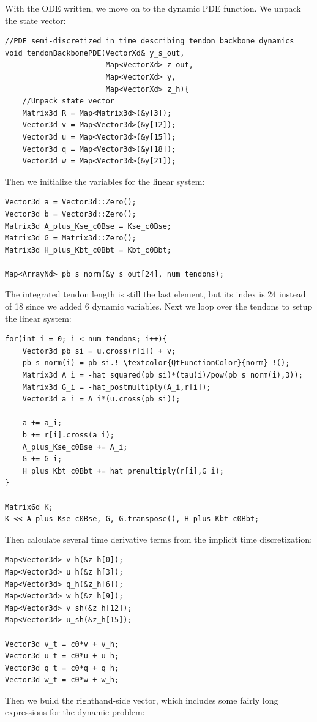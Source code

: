 \documentclass[12pt]{article}
\begin{document}
With the ODE written, we move on to the dynamic PDE function. We unpack the state vector:
\begin{lstlisting}
//PDE semi-discretized in time describing tendon backbone dynamics
void tendonBackbonePDE(VectorXd& y_s_out,
                       Map<VectorXd> z_out,
                       Map<VectorXd> y,
                       Map<VectorXd> z_h){
    //Unpack state vector
    Matrix3d R = Map<Matrix3d>(&y[3]);
    Vector3d v = Map<Vector3d>(&y[12]);
    Vector3d u = Map<Vector3d>(&y[15]);
    Vector3d q = Map<Vector3d>(&y[18]);
    Vector3d w = Map<Vector3d>(&y[21]);
\end{lstlisting}
Then we initialize the variables for the linear system:
\begin{lstlisting}
Vector3d a = Vector3d::Zero();
Vector3d b = Vector3d::Zero();
Matrix3d A_plus_Kse_c0Bse = Kse_c0Bse;
Matrix3d G = Matrix3d::Zero();
Matrix3d H_plus_Kbt_c0Bbt = Kbt_c0Bbt;

Map<ArrayNd> pb_s_norm(&y_s_out[24], num_tendons);
\end{lstlisting}
The integrated tendon length is still the last element, but its index is 24 instead of 18 since we added 6 dynamic variables. Next we loop over the tendons to setup the linear system:
\newpage
\begin{lstlisting}
for(int i = 0; i < num_tendons; i++){
    Vector3d pb_si = u.cross(r[i]) + v;
    pb_s_norm(i) = pb_si.!-\textcolor{QtFunctionColor}{norm}-!();
    Matrix3d A_i = -hat_squared(pb_si)*(tau(i)/pow(pb_s_norm(i),3));
    Matrix3d G_i = -hat_postmultiply(A_i,r[i]);
    Vector3d a_i = A_i*(u.cross(pb_si));

    a += a_i;
    b += r[i].cross(a_i);
    A_plus_Kse_c0Bse += A_i;
    G += G_i;
    H_plus_Kbt_c0Bbt += hat_premultiply(r[i],G_i);
}

Matrix6d K;
K << A_plus_Kse_c0Bse, G, G.transpose(), H_plus_Kbt_c0Bbt;
\end{lstlisting}
Then calculate several time derivative terms from the implicit time discretization:
\begin{lstlisting}
Map<Vector3d> v_h(&z_h[0]);
Map<Vector3d> u_h(&z_h[3]);
Map<Vector3d> q_h(&z_h[6]);
Map<Vector3d> w_h(&z_h[9]);
Map<Vector3d> v_sh(&z_h[12]);
Map<Vector3d> u_sh(&z_h[15]);

Vector3d v_t = c0*v + v_h;
Vector3d u_t = c0*u + u_h;
Vector3d q_t = c0*q + q_h;
Vector3d w_t = c0*w + w_h;
\end{lstlisting}
Then we build the righthand-side vector, which includes some fairly long expressions for the dynamic problem:
\end{document}
